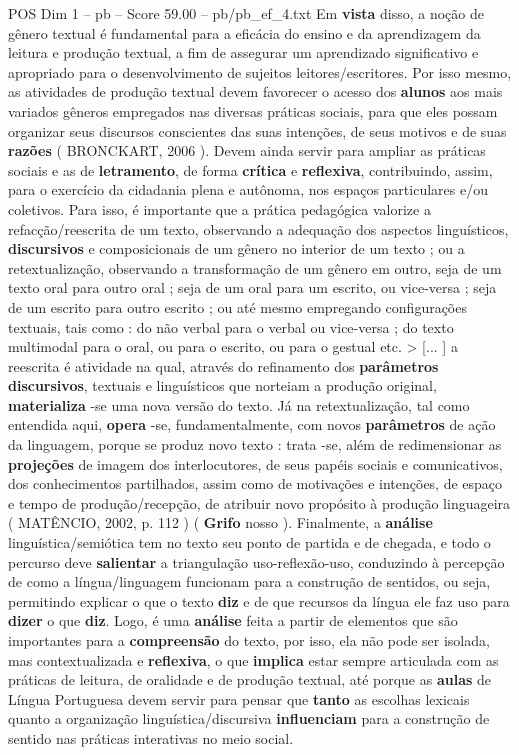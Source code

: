 \begin{textsample}{POS Dim 1 – pb – Score 59.00 – pb/pb\_ef\_4.txt}
Em \textbf{vista} disso, a noção de gênero textual é fundamental para a eficácia do ensino e da aprendizagem da leitura e produção textual, a fim de assegurar um aprendizado significativo e apropriado para o desenvolvimento de sujeitos leitores/escritores.
Por isso mesmo, as atividades de produção textual devem favorecer o acesso dos \textbf{alunos} aos mais variados gêneros empregados nas diversas práticas sociais, para que eles possam organizar seus discursos conscientes das suas intenções, de seus motivos e de suas \textbf{razões} ( BRONCKART, 2006 ).
Devem ainda servir para ampliar as práticas sociais e as de \textbf{letramento}, de forma \textbf{crítica} e \textbf{reflexiva}, contribuindo, assim, para o exercício da cidadania plena e autônoma, nos espaços particulares e/ou coletivos.
Para isso, é importante que a prática pedagógica valorize a refacção/reescrita de um texto, observando a adequação dos aspectos linguísticos, \textbf{discursivos} e composicionais de um gênero no interior de um texto ; ou a retextualização, observando a transformação de um gênero em outro, seja de um texto oral para outro oral ; seja de um oral para um escrito, ou vice-versa ; seja de um escrito para outro escrito ; ou até mesmo empregando configurações textuais, tais como : do não verbal para o verbal ou vice-versa ; do texto multimodal para o oral, ou para o escrito, ou para o gestual etc. > [... ] a reescrita é atividade na qual, através do refinamento dos \textbf{parâmetros} \textbf{discursivos}, textuais e linguísticos que norteiam a produção original, \textbf{materializa} -se uma nova versão do texto.
Já na retextualização, tal como entendida aqui, \textbf{opera} -se, fundamentalmente, com novos \textbf{parâmetros} de ação da linguagem, porque se produz novo texto : trata -se, além de redimensionar as \textbf{projeções} de imagem dos interlocutores, de seus papéis sociais e comunicativos, dos conhecimentos partilhados, assim como de motivações e intenções, de espaço e tempo de produção/recepção, de atribuir novo propósito à produção linguageira ( MATÊNCIO, 2002, p. 112 ) ( \textbf{Grifo} nosso ).
Finalmente, a \textbf{análise} linguística/semiótica tem no texto seu ponto de partida e de chegada, e todo o percurso deve \textbf{salientar} a triangulação uso-reflexão-uso, conduzindo à percepção de como a língua/linguagem funcionam para a construção de sentidos, ou seja, permitindo explicar o que o texto \textbf{diz} e de que recursos da língua ele faz uso para \textbf{dizer} o que \textbf{diz}.
Logo, é uma \textbf{análise} feita a partir de elementos que são importantes para a \textbf{compreensão} do texto, por isso, ela não pode ser isolada, mas contextualizada e \textbf{reflexiva}, o que \textbf{implica} estar sempre articulada com as práticas de leitura, de oralidade e de produção textual, até porque as \textbf{aulas} de Língua Portuguesa devem servir para pensar que \textbf{tanto} as escolhas lexicais quanto a organização linguística/discursiva \textbf{influenciam} para a construção de sentido nas práticas interativas no meio social.

\end{textsample}
